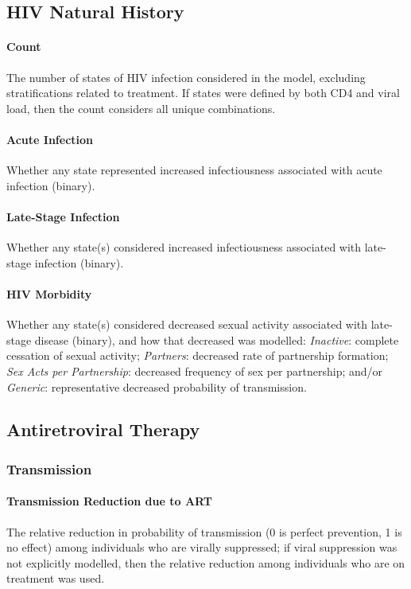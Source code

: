 \subsection{HIV Natural History}\label{app.sr.defs.hiv}
\paragraph{Count}
The number of states of HIV infection considered in the model,
excluding stratifications related to treatment.
If states were defined by both CD4 and viral load,
then the count considers all unique combinations.
\paragraph{Acute Infection}
Whether any state represented increased infectiousness associated with acute infection (binary).
\paragraph{Late-Stage Infection}
Whether any state(s) considered increased infectiousness associated with late-stage infection (binary).
\paragraph{HIV Morbidity}
Whether any state(s) considered decreased sexual activity associated with late-stage disease (binary),
and how that decreased was modelled:
\emph{Inactive}: complete cessation of sexual activity;
\emph{Partners}: decreased rate of partnership formation;
\emph{Sex Acts per Partnership}: decreased frequency of sex per partnership; and/or
\emph{Generic}: representative decreased probability of transmission.
\subsection{Antiretroviral Therapy}\label{app.sr.defs.art}
\subsubsection{Transmission}\label{app.sr.defs.art.trans}
\label{aaa:defs:trans}
\paragraph{Transmission Reduction due to ART}
The relative reduction in probability of transmission
(0 is perfect prevention, 1 is no effect)
among individuals who are virally suppressed;
if viral suppression was not explicitly modelled,
then the relative reduction among individuals who are on treatment was used.
